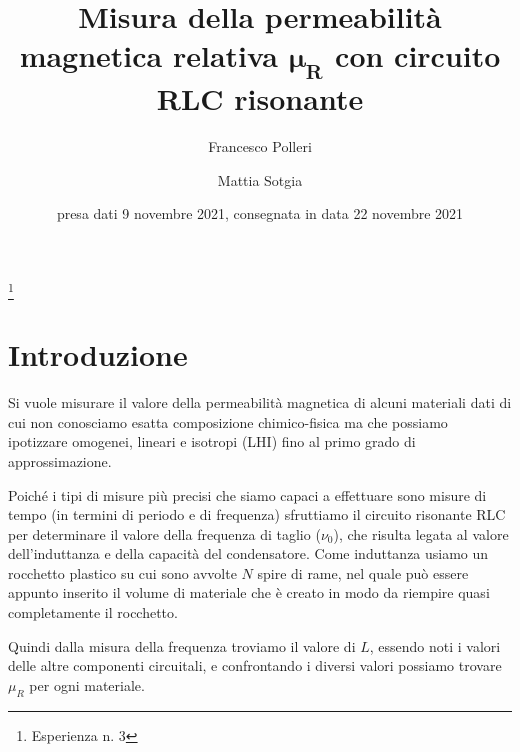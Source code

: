 \documentclass[
    rmp,
    floatfix,
    reprint, 
    superscriptaddress, 
    altaffilletter, 
    amsmath, 
    amssymb, 
    a4paper]{revtex4-2}
\begin{document}
\title{Misura della permeabilità magnetica relativa $\mathbf{\mu_R}$ con circuito RLC risonante
}
\thanks{Esperienza n. 3
}

\author{Francesco Polleri}
\author{Mattia Sotgia}


\date{presa dati
    9 novembre 2021, consegnata in data
    22 novembre 2021
}

\begin{abstract}
    
\end{abstract}
\maketitle
\thispagestyle{fancy}


\section*{Introduzione}\label{sec:introduction}
Si vuole misurare il valore della permeabilità magnetica di alcuni materiali dati di cui non conosciamo esatta composizione chimico-fisica ma che possiamo ipotizzare omogenei, lineari e isotropi (LHI) fino al primo grado di approssimazione. 

Poiché i tipi di misure più precisi che siamo capaci a effettuare sono misure di tempo (in termini di periodo e di frequenza) sfruttiamo il circuito risonante RLC per determinare il valore della frequenza di taglio ($\nu_0$), che risulta legata al valore dell'induttanza e della capacità del condensatore. Come induttanza usiamo un rocchetto plastico su cui sono avvolte $N$ spire di rame, nel quale può essere appunto inserito il volume di materiale che è creato in modo da riempire quasi completamente il rocchetto. 

Quindi dalla misura della frequenza troviamo il valore di $L$, essendo noti i valori delle altre componenti circuitali, e confrontando i diversi valori possiamo trovare $\mu_R$ per ogni materiale.
\end{document}
